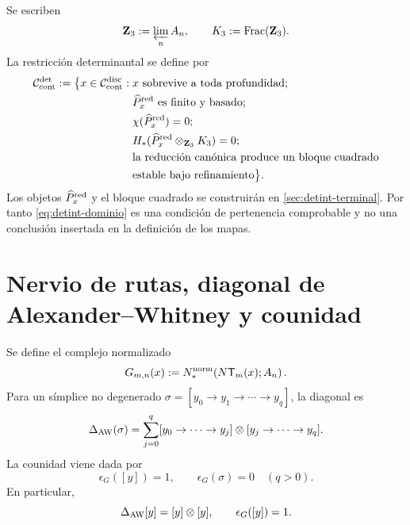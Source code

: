 Se escriben
\begin{equation}\label{eq:detint-z3-k3}
 \mathbf Z_3:=\varprojlim_n A_n,
 \qquad
 K_3:=\operatorname{Frac}(\mathbf Z_3).
\end{equation}
La restricción determinantal se define por
\begin{equation}\label{eq:detint-dominio}
\begin{split}
 \mathcal C_{\rm cont}^{\rm det}:=
 \bigl\{x\in\mathcal C_{\rm cont}^{\rm disc}:{}&
 x\text{ sobrevive a toda profundidad};\\
 &\widehat P_x^{\rm red}\text{ es finito y basado};\\
 &\chi(\widehat P_x^{\rm red})=0;\\
 &H_*(\widehat P_x^{\rm red}\otimes_{\mathbf Z_3}K_3)=0;\\
 &\text{la reducción canónica produce un bloque cuadrado}\\
 &\text{estable bajo refinamiento}\bigr\}.
\end{split}
\end{equation}
Los objetos \(\widehat P_x^{\rm red}\) y el bloque cuadrado se construirán
en \cref{sec:detint-terminal}. Por tanto
\eqref{eq:detint-dominio} es una condición de pertenencia comprobable y no
una conclusión insertada en la definición de los mapas.

\fi
\section{Nervio de rutas, diagonal de Alexander--Whitney y counidad}

Se define el complejo normalizado
\begin{equation}\label{eq:detint-gmn}
 G_{m,n}(x):=
 N_*^{\rm norm}\!\left(N\mathsf T_m(x);A_n\right).
\end{equation}
Para un símplice no degenerado
\(\sigma=[y_0\to y_1\to\cdots\to y_q]\), la diagonal es
\begin{equation}\label{eq:detint-aw}
 \Delta_{\rm AW}(\sigma)
 =\sum_{j=0}^q
 [y_0\to\cdots\to y_j]\otimes
 [y_j\to\cdots\to y_q].
\end{equation}
La counidad viene dada por
\begin{equation}\label{eq:detint-counidad-g}
 \epsilon_G([y])=1,
 \qquad
 \epsilon_G(\sigma)=0\quad(q>0).
\end{equation}
En particular,
\begin{equation}\label{eq:detint-vertice-grouplike}
 \Delta_{\rm AW}[y]=[y]\otimes[y],
 \qquad
 \epsilon_G([y])=1.
\end{equation}

